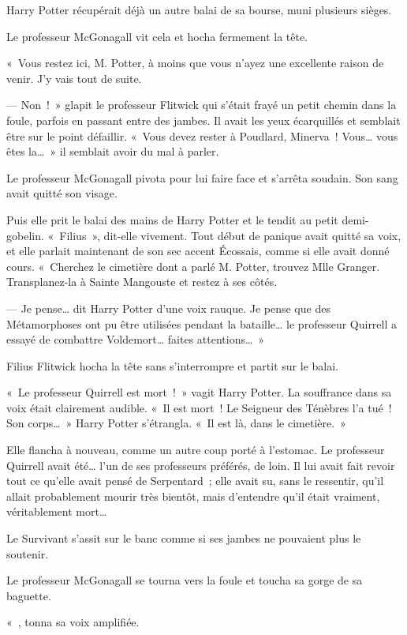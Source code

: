 Harry Potter récupérait déjà un autre balai de sa bourse, muni plusieurs sièges.

Le professeur McGonagall vit cela et hocha fermement la tête.

«~Vous restez ici, M. Potter, à moins que vous n'ayez une excellente raison de venir.
J'y vais tout de suite.

--- Non~!~»
glapit le professeur Flitwick qui s'était frayé un petit chemin dans la foule, parfois en passant entre des jambes.
Il avait les yeux écarquillés et semblait être sur le point défaillir.
«~Vous devez rester à Poudlard, Minerva~!
Vous… vous êtes la…~»
il semblait avoir du mal à parler.

Le professeur McGonagall pivota pour lui faire face et s'arrêta soudain.
Son sang avait quitté son visage.

Puis elle prit le balai des mains de Harry Potter et le tendit au petit demi-gobelin.
«~Filius~», dit-elle vivement.
Tout début de panique avait quitté sa voix, et elle parlait maintenant de son sec accent Écossais, comme si elle avait donné cours.
«~Cherchez le cimetière dont a parlé M. Potter, trouvez Mlle Granger.
Transplanez-la à Sainte Mangouste et restez à ses côtés.

--- Je pense… dit Harry Potter d'une voix rauque.
Je pense que des Métamorphoses ont pu être utilisées pendant la bataille… le professeur Quirrell a essayé de combattre Voldemort… faites attentions…~»

Filius Flitwick hocha la tête sans s'interrompre et partit sur le balai.

«~Le professeur Quirrell est mort~!~»
vagit Harry Potter.
La souffrance dans sa voix était clairement audible.
«~Il est mort~!
Le Seigneur des Ténèbres l'a tué~!
Son corps…~»
Harry Potter s'étrangla.
«~Il est là, dans le cimetière.~»

Elle flancha à nouveau, comme un autre coup porté à l'estomac.
Le professeur Quirrell avait été… l'un de ses professeurs préférés, de loin.
Il lui avait fait revoir tout ce qu'elle avait pensé de Serpentard~; elle avait su, sans le ressentir, qu'il allait probablement mourir très bientôt, mais d'entendre qu'il était vraiment, véritablement mort…

Le Survivant s'assit sur le banc comme si ses jambes ne pouvaient plus le soutenir.

Le professeur McGonagall se tourna vers la foule et toucha sa gorge de sa baguette.

«~, tonna sa voix amplifiée.

